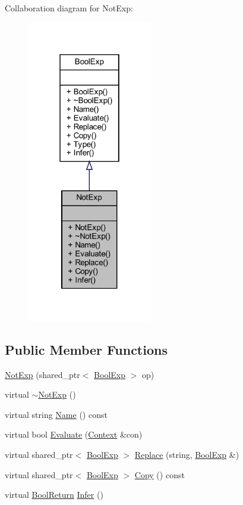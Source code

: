 Collaboration diagram for Not\+Exp\+:
\nopagebreak
\begin{figure}[H]
\begin{center}
\leavevmode
\includegraphics[width=154pt]{classNotExp__coll__graph}
\end{center}
\end{figure}
\subsection*{Public Member Functions}
\begin{DoxyCompactItemize}
\item 
\mbox{\hyperlink{classNotExp_a490e8c258f876cd07a9e6b1eca5d41cc}{Not\+Exp}} (shared\+\_\+ptr$<$ \mbox{\hyperlink{classBoolExp}{Bool\+Exp}} $>$ op)
\item 
virtual \mbox{\hyperlink{classNotExp_ad2533f2e22a5df49eac125d4c5d82936}{$\sim$\+Not\+Exp}} ()
\item 
virtual string \mbox{\hyperlink{classNotExp_a7363cb79787e02ca362a4ea6cdd6d7e2}{Name}} () const
\item 
virtual bool \mbox{\hyperlink{classNotExp_a4bf3ac9a898127b4d0c63db2a5f7a82f}{Evaluate}} (\mbox{\hyperlink{classContext}{Context}} \&con)
\item 
virtual shared\+\_\+ptr$<$ \mbox{\hyperlink{classBoolExp}{Bool\+Exp}} $>$ \mbox{\hyperlink{classNotExp_aeba42c37b59e0eaaf981260e4b163d98}{Replace}} (string, \mbox{\hyperlink{classBoolExp}{Bool\+Exp}} \&)
\item 
virtual shared\+\_\+ptr$<$ \mbox{\hyperlink{classBoolExp}{Bool\+Exp}} $>$ \mbox{\hyperlink{classNotExp_adb36074264fb55186f781680cb6c35f9}{Copy}} () const
\item 
virtual \mbox{\hyperlink{structBoolReturn}{Bool\+Return}} \mbox{\hyperlink{classNotExp_ad7ec5fee6dd934a3db7f72cc9e0b809a}{Infer}} ()
\end{DoxyCompactItemize}



